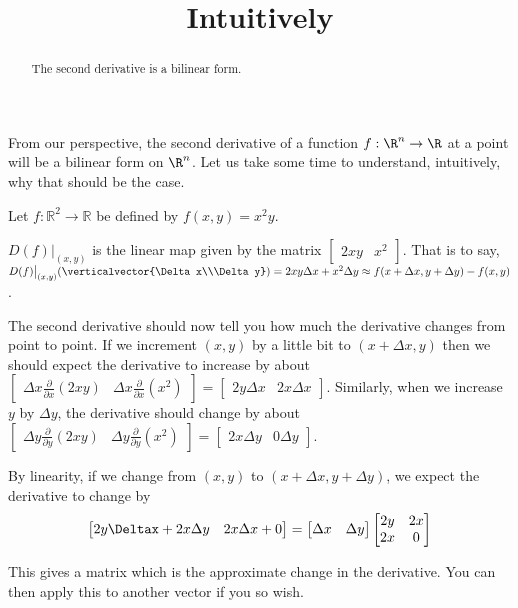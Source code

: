 \documentclass{ximera}
\title{Intuitively}
\begin{document}
\begin{abstract}
	The second derivative is a bilinear form.
\end{abstract}
	
	From our perspective, the second derivative of a function $f: \R^n \to \R$ at a point will be a bilinear form on $\R^n$.  
	Let us take some time to understand, intuitively, why that should be the case.
	
	Let $f:\mathbb{R}^2 \to \mathbb{R}$ be defined by $f(x,y) = x^2y$.

$D(f)\big|_{(x,y)}$ is the linear map given by the matrix $\left[ \begin{matrix} 2xy&x^2\end{matrix} \right]$.  
That is to say, $D(f)\big|_{(x,y)}(\verticalvector{\Delta x\\\Delta y}) = 2xy\Delta x + x^2\Delta y \approx f(x+\Delta x,y+\Delta y) - f(x,y)$.  

The second derivative should now tell you how much the derivative changes from point to point.  
If we increment $(x,y)$ by a little bit to $(x+\Delta x,y)$ then we should expect the derivative to 
increase by about $\begin{bmatrix} \Delta x \frac{\partial}{ \partial x} ( 2xy) & \Delta x\frac{\partial}{\partial x}(x^2) \end{bmatrix} = \begin{bmatrix} 2y\Delta x&2x \Delta x\end{bmatrix}$.  
Similarly, when we increase $y$ by $\Delta y$, the derivative should change by about 
$\begin{bmatrix} \Delta y \frac{\partial}{ \partial y} ( 2xy) & \Delta y\frac{\partial}{\partial y}(x^2) \end{bmatrix} = \begin{bmatrix} 2x \Delta y&0\Delta y\end{bmatrix}$.

By linearity, if we change from $(x,y)$ to $(x+\Delta x,y+\Delta y)$, 
we expect the derivative to change by
 \[\begin{bmatrix} 2y\Deltax + 2x\Delta y & 2x\Delta x + 0 \end{bmatrix}  = \begin{bmatrix} \Delta x&\Delta y\end{bmatrix} \begin{bmatrix} 2y&2x\\2x&0\end{bmatrix} \]

This gives a matrix which is the approximate change in the derivative.  You can then apply this to another vector if you so wish.  
\end{document}

